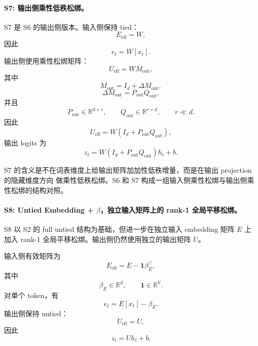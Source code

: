 \paragraph{S7: 输出侧乘性低秩松绑。}
S7 是 S6 的输出侧版本。输入侧保持 tied：
\begin{equation}
    E_{\mathrm{eff}} = W,
\end{equation}
因此
\begin{equation}
    e_t = W[x_t].
\end{equation}
输出侧使用乘性松绑矩阵：
\begin{equation}
    U_{\mathrm{eff}} = W M_{\mathrm{out}},
\end{equation}
其中
\begin{equation}
    M_{\mathrm{out}} = I_d + \Delta M_{\mathrm{out}},
\end{equation}
\begin{equation}
    \Delta M_{\mathrm{out}} = P_{\mathrm{out}}Q_{\mathrm{out}},
\end{equation}
并且
\begin{equation}
    P_{\mathrm{out}} \in \mathbb{R}^{d \times r}, \qquad
    Q_{\mathrm{out}} \in \mathbb{R}^{r \times d}, \qquad
    r \ll d.
\end{equation}
因此
\begin{equation}
    U_{\mathrm{eff}} =
    W(I_d + P_{\mathrm{out}}Q_{\mathrm{out}}),
\end{equation}
输出 logits 为
\begin{equation}
    z_t =
    W(I_d + P_{\mathrm{out}}Q_{\mathrm{out}})h_t + b.
\end{equation}

S7 的含义是不在词表维度上给输出矩阵加加性低秩增量，而是在输出 projection 的隐藏维度方向
做乘性低秩松绑。S6 和 S7 构成一组输入侧乘性松绑与输出侧乘性松绑的结构对照。

\paragraph{S8: Untied Embedding + $\beta$，独立输入矩阵上的 rank-1 全局平移松绑。}
S8 以 S2 的 full untied 结构为基础，但进一步在独立输入 embedding 矩阵 $E$ 上加入
rank-1 全局平移松绑。输出侧仍然使用独立的输出矩阵 $U$。

输入侧有效矩阵为
\begin{equation}
    E_{\mathrm{eff}} = E - \mathbf{1}\beta_E^\top,
\end{equation}
其中
\begin{equation}
    \beta_E \in \mathbb{R}^{d}, \qquad
    \mathbf{1} \in \mathbb{R}^{V}.
\end{equation}
对单个 token，有
\begin{equation}
    e_t = E[x_t] - \beta_E.
\end{equation}
输出侧保持 untied：
\begin{equation}
    U_{\mathrm{eff}} = U,
\end{equation}
因此
\begin{equation}
    z_t = U h_t + b.
\end{equation}

